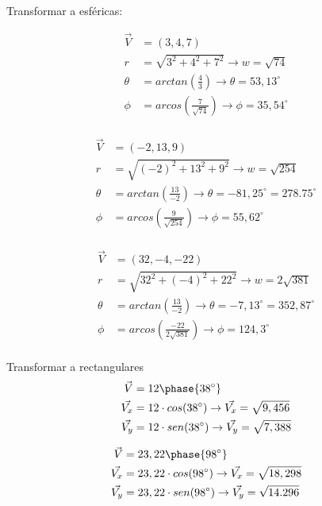     Transformar a esféricas:

    \begin{align*}
        \vec{V}&=(3,4,7) \\
        r &= \sqrt{3^2+4^2+7^2} \rightarrow w =\sqrt{74}  \\
        \theta&= arctan\left(\frac{4}{3}\right)  \rightarrow \theta= 53,13^\circ \\
        \phi &=arcos\left(\frac{7}{\sqrt{74}}\right)  \rightarrow \phi= 35,54^\circ\\
    \end{align*}

    \begin{align*}
        \vec{V}&=(-2,13,9) \\
        r &= \sqrt{(-2)^2+13^2+9^2}  \rightarrow w =\sqrt{254}  \\
        \theta&= arctan\left(\frac{13}{-2}\right)  \rightarrow \theta= -81,25^\circ= 278.75^\circ\\
        \phi &= arcos\left(\frac{9}{\sqrt{254}}\right)  \rightarrow \phi=  55,62^\circ\\
    \end{align*}

    \begin{align*}
        \vec{V}&=(32,-4,-22) \\
        r &= \sqrt{32^2+(-4)^2+22^2}  \rightarrow w =2\sqrt{381}  \\
        \theta&= arctan\left(\frac{13}{-2}\right)  \rightarrow \theta= -7,13^\circ=352,87^\circ \\
        \phi &= arcos\left(\frac{-22}{2\sqrt{381}}\right)  \rightarrow \phi= 124,3^\circ\\
    \end{align*}

    Transformar a rectangulares
    \begin{align*}
        \vec{V}&=12\phase{38^\circ}  \\
        \vec{V_x}&= 12\cdot cos(38^\circ) \rightarrow \vec{V_x} = \sqrt{9,456} \\
        \vec{V_y}& =  12\cdot sen(38^\circ)  \rightarrow \vec{V_y}= \sqrt{7,388} \\
    \end{align*}

    \begin{align*}
        \vec{V}&=23,22 \phase{98^\circ}  \\
        \vec{V_x}&= 23,22\cdot cos(98^\circ)  \rightarrow \vec{V_x} = \sqrt{18,298} \\
        \vec{V_y}& =  23,22\cdot sen(98^\circ)  \rightarrow \vec{V_y}= \sqrt{14.296} \\
    \end{align*}

